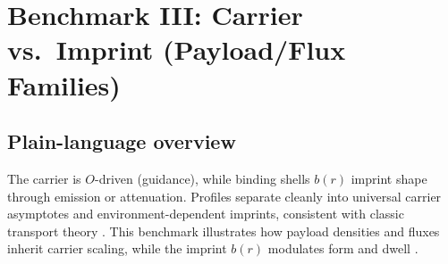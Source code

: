 \documentclass[12pt,a4paper,oneside]{scrreprt}
\begin{document}
\chapter{Benchmark III: Carrier vs.\ Imprint (Payload/Flux Families)}
\section*{Plain-language overview}
The carrier is $O$-driven (guidance), while binding shells $b(r)$ imprint
shape through emission or attenuation.  
Profiles separate cleanly into universal carrier asymptotes and
environment-dependent imprints, consistent with classic transport theory
\cite{Bird2002,Schuss2009}.  
This benchmark illustrates how payload densities and fluxes inherit
carrier scaling, while the imprint $b(r)$ modulates form and dwell
\cite{Zwanzig2001,Weiss1999}.
\end{document}
